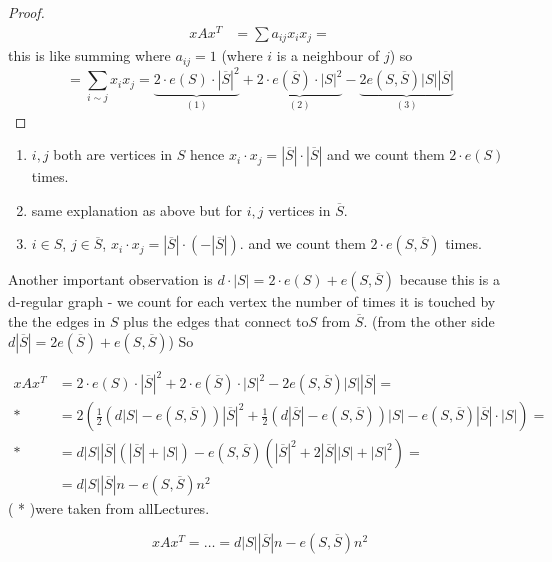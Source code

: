 \begin{thm}
\begin{proof}
\begin{align*}
xAx^{T} & =\sum a_{ij}x_{i}x_{j}=
\end{align*}
 this is like summing where $a_{ij}=1$ (where $i$ is a neighbour
of $j$) so 
\[
=\sum\limits _{i\sim j}x_{i}x_{j}=\underbrace{2\cdot e\left(S\right)\cdot\left|\overline{S}\right|^{2}}_{\left(1\right)}+\underbrace{2\cdot e\left(\overline{S}\right)\cdot\left|S\right|^{2}}_{\left(2\right)}-\underbrace{2e\left(S,\overline{S}\right)\left|S\right|\left|\overline{S}\right|}_{\left(3\right)}
\]
\end{proof}
\begin{enumerate}
\item $i,j$ both are vertices in $S$ hence $x_{i}\cdot x_{j}=\left|\overline{S}\right|\cdot\left|\overline{S}\right|$
and we count them $2\cdot e\left(S\right)$ times. 
\item same explanation as above but for $i,j$ vertices in $\overline{S}$.
\item $i\in S$, $j\in\overline{S}$, $x_{i}\cdot x_{j}=\left|\overline{S}\right|\cdot\left(-\left|\overline{S}\right|\right)$.
and we count them $2\cdot e\left(S,\overline{S}\right)$ times.
\end{enumerate}
Another important observation is $d\cdot\left|S\right|=2\cdot e\left(S\right)+e\left(S,\overline{S}\right)$
because this is a d-regular graph - we count for each vertex the number
of times it is touched by the the edges in $S$ plus the edges that
connect to$S$ from $\overline{S}$. (from the other side $d\left|\overline{S}\right|=2e\left(\overline{S}\right)+e\left(S,\overline{S}\right)$)
So %
\begin{insight}
\begin{align*}
xAx^{T} & =2\cdot e\left(S\right)\cdot\left|\overline{S}\right|^{2}+2\cdot e\left(\overline{S}\right)\cdot\left|S\right|^{2}-2e\left(S,\overline{S}\right)\left|S\right|\left|\overline{S}\right|=\\
* & =2\left(\frac{1}{2}\left(d\left|S\right|-e\left(S,\overline{S}\right)\right)\left|\overline{S}\right|^{2}+\frac{1}{2}\left(d\left|\overline{S}\right|-e\left(S,\overline{S}\right)\right)\left|S\right|-e\left(S,\overline{S}\right)\left|\overline{S}\right|\cdot\left|S\right|\right)=\\
* & =d\left|S\right|\left|\overline{S}\right|\left(\left|\overline{S}\right|+\left|S\right|\right)-e\left(S,\overline{S}\right)\left(\left|\overline{S}\right|^{2}+2\left|\overline{S}\right|\left|S\right|+\left|S\right|^{2}\right)=\\
 & =d\left|S\right|\left|\overline{S}\right|n-e\left(S,\overline{S}\right)n^{2}
\end{align*}
( {*} )were taken from allLectures.%
\end{insight}
{} 
\[
xAx^{T}=\dots=d\left|S\right|\left|\overline{S}\right|n-e\left(S,\overline{S}\right)n^{2}
\]


\end{thm}
